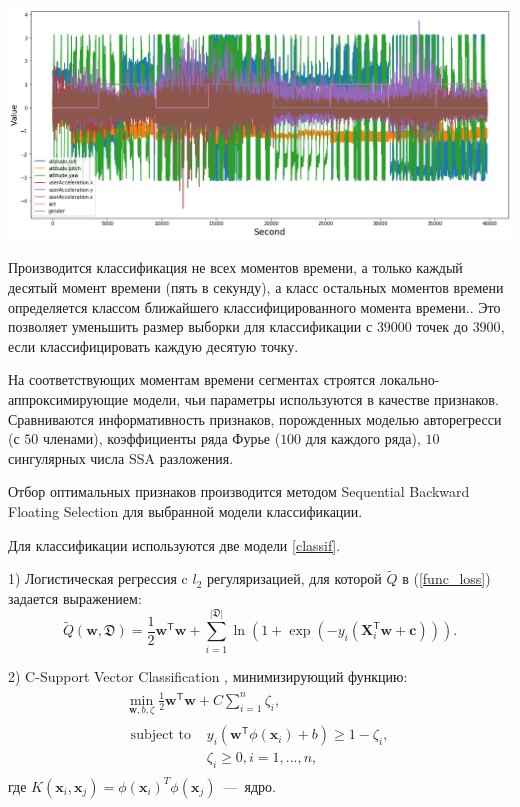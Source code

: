\documentclass[12pt, twoside]{article}
\begin{document}
\includegraphics[scale=0.43]{data}

Производится классификация не всех моментов времени, а только каждый десятый момент времени (пять в секунду), а класс остальных моментов времени определяется классом ближайшего классифицированного момента времени.. Это позволяет уменьшить размер выборки для классификации с $39000$ точек до $3900$, если классифицировать каждую десятую точку.

На соответствующих моментам времени сегментах строятся локально-аппроксимирующие модели, чьи параметры используются в качестве признаков. Сравниваются информативность признаков, порожденных моделью авторегресси (с $50$ членами), коэффициенты ряда Фурье ($100$ для каждого ряда), $10$ сингулярных числа SSA разложения. 

Отбор оптимальных признаков производится методом Sequential Backward Floating Selection \cite{Somol10} для выбранной модели классификации. 

Для классификации используются две модели \eqref{classif}.


1) Логистическая регрессия \cite{Peng02} c $l_2$ регуляризацией, для которой $\widetilde{Q}$ в (\ref{func_loss}) задается выражением:
$$\widetilde{Q}(\mathbf{w},\mathfrak{D}) = \frac{1}{2}\mathbf{w}^\mathsf{T}\mathbf{w} + \sum\limits_{i=1}^{|\mathfrak{D}|} \ln(1+\exp(-y_i(\mathbf{X}_i^\mathsf{T}\mathbf{w}+\mathbf{c}))).$$

2) C-Support Vector Classification \cite{Liu11}, минимизирующий функцию: 
\begin{align}\begin{aligned}\min_ {\mathbf{w}, b, \zeta} \frac{1}{2} \mathbf{w}^\mathsf{T} \mathbf{w} + C \sum_{i=1}^{n} \zeta_i,\\\begin{split}\textrm {subject to } & y_i (\mathbf{w}^\mathsf{T} \phi (\mathbf{x}_i) + b) \geq 1 - \zeta_i,\\
& \zeta_i \geq 0, i=1, ..., n,\end{split}\end{aligned}\end{align}
где $K(\mathbf{x}_i, \mathbf{x}_j) = \phi (\mathbf{x}_i)^T \phi (\mathbf{x}_j)$~---~ядро.
\end{document}
